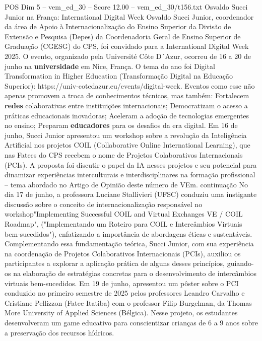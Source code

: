 \begin{textsample}{POS Dim 5 – vem\_ed\_30 – Score 12.00 – vem\_ed\_30/t156.txt}  \label{ex:f5_pos_030}
Osvaldo Succi Junior na França: International Digital Week Osvaldo Succi Junior, coordenador da área de Apoio à Internacionalização do Ensino Superior da Divisão de Extensão e Pesquisa (Depes) da Coordenadoria Geral de Ensino Superior de Graduação (CGESG) do CPS, foi convidado para a International Digital Week 2025.
O evento, organizado pela Université Côte D´Azur, ocorreu de 16 a 20 de junho na \textbf{universidade} em Nice, França.
O tema do ano foi Digital Transformation in Higher Education (Transformação Digital na Educação Superior): https://univ-cotedazur.eu/events/digital-week.
Eventos como esse não apenas promovem a troca de conhecimentos técnicos, mas também: Fortalecem \textbf{redes} colaborativas entre instituições internacionais; Democratizam o acesso a práticas educacionais inovadoras; Aceleram a adoção de tecnologias emergentes no ensino; Preparam \textbf{educadores} para os desafios da era digital.
Em 16 de junho, Succi Junior apresentou um workshop sobre a revolução da Inteligência Artificial nos projetos COIL (Collaborative Online International Learning), que nas Fatecs do CPS recebem o nome de Projetos Colaborativos Internacionais (PCIs).
A proposta foi discutir o papel da IA nesses projetos e seu potencial para dinamizar experiências interculturais e interdisciplinares na formação profissional – tema abordado no Artigo de Opinião deste número de VEm. continuação No dia 17 de junho, a professora Luciane Stallivieri (UFSC) conduziu uma instigante discussão sobre o conceito de internacionalização responsável no workshop"Implementing Successful COIL and Virtual Exchanges VE / COIL Roadmap", ("Implementando um Roteiro para COIL e Intercâmbios Virtuais bem-sucedidos"), enfatizando a importância de abordagens éticas e sustentáveis.
Complementando essa fundamentação teórica, Succi Junior, com sua experiência na coordenação de Projetos Colaborativos Internacionais (PCIs), auxiliou os participantes a explorar a aplicação prática de alguns desses princípios, guiando-os na elaboração de estratégias concretas para o desenvolvimento de intercâmbios virtuais bem-sucedidos.
Em 19 de junho, apresentou um pôster sobre o PCI conduzido no primeiro semestre de 2025 pelos professores Leandro Carvalho e Cristiane Pellizzon (Fatec Itatiba) com o professor Filip Burgelman, da Thomas More University of Applied Sciences (Bélgica).
Nesse projeto, os estudantes desenvolveram um game educativo para conscientizar crianças de 6 a 9 anos sobre a preservação dos recursos hídricos.

\end{textsample}
